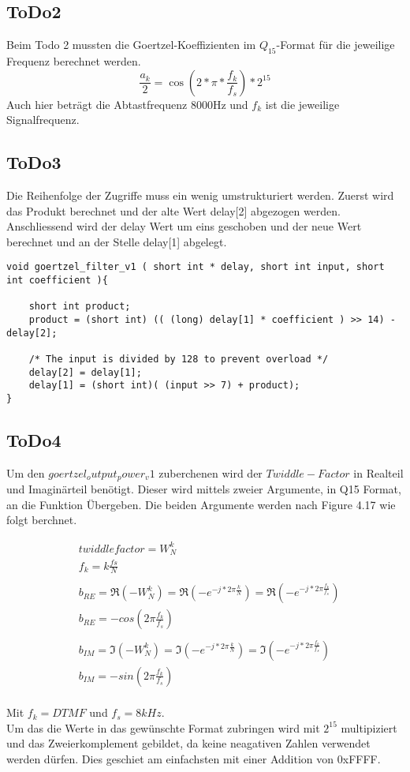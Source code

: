\documentclass[a4paper,11pt]{article}
\begin{document}
\subsection{ToDo2}
Beim Todo 2 mussten die Goertzel-Koeffizienten im $Q_{15}$-Format für die jeweilige Frequenz berechnet werden.
\begin{equation}\label{eq:Goertzel_Koeff}
	\frac{a_k}{2}= \cos(2*\pi*\frac{f_k}{f_s})*2^{15}
\end{equation}
Auch hier beträgt die Abtastfrequenz 8000Hz und $f_k$ ist die jeweilige Signalfrequenz.

\subsection{ToDo3}
Die Reihenfolge der Zugriffe muss ein wenig umstrukturiert werden. Zuerst wird das Produkt berechnet und der alte Wert delay[2] abgezogen werden. Anschliessend wird der delay Wert um eins geschoben und der neue Wert berechnet und an der Stelle delay[1] abgelegt. 
\begin{lstlisting}
void goertzel_filter_v1 ( short int * delay, short int input, short int coefficient ){
	
	short int product;
	product = (short int) (( (long) delay[1] * coefficient ) >> 14) - delay[2];

	/* The input is divided by 128 to prevent overload */
	delay[2] = delay[1];
	delay[1] = (short int)( (input >> 7) + product);
}
\end{lstlisting}

\subsection{ToDo4}
Um den $goertzel_output_power_v1$ zuberchenen wird der $Twiddle-Factor$ in Realteil und Imaginärteil benötigt. Dieser wird mittels zweier Argumente, in Q15 Format, an die Funktion Übergeben. Die beiden Argumente werden nach Figure 4.17 wie folgt berchnet.

\begin{align*}
	&twiddlefactor = W^{k}_{N} \\
	&f_k = k\frac{fs}{N} \\\\
	&b_{RE} =\Re{(-W^{k}_{N})} = \Re{(-e^{-j*2\pi \frac{k}{N}})}=  \Re{(-e^{-j*2\pi \frac{f_k}{f_s}})}\\
	&b_{RE} = -cos(2\pi\frac{f_k}{f_s})\\\\
	&b_{IM} =\Im{(-W^{k}_{N})} = \Im{(-e^{-j*2\pi \frac{k}{N}})}=  \Im{(-e^{-j*2\pi \frac{f_k}{f_s}})}\\
	&b_{IM} = -sin(2\pi\frac{f_k}{f_s})
\end{align*}
\\
Mit $f_k = DTMF$ und $f_s = 8kHz$.
\\
Um das die Werte in das gewünschte Format zubringen wird mit $2^{15}$ multipiziert und das Zweierkomplement gebildet, da keine neagativen Zahlen verwendet werden dürfen. Dies geschiet am einfachsten mit einer Addition von 0xFFFF.
\end{document}
